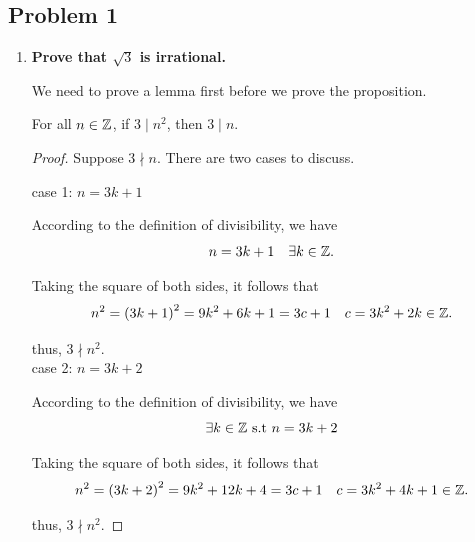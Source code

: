 
\subsection{Problem 1}
\begin{enumerate}[label=(\Roman*)]
    \item \textbf{Prove that $\sqrt{3}$ is irrational.}
    
    We need to prove a lemma first before we prove the proposition. 
     \begin{lemma} \label{lemma 1}
            For all $n \in \mathbb{Z}$, if $3 \mid n^2$, then $3 \mid n$. 

            \begin{proof}
                Suppose $3 \nmid n$. There are two cases to discuss.  
                
                case 1: $n = 3k + 1$

                According to the definition of divisibility, we have 
                \begin{equation*}
                    n = 3k + 1 \quad \exists k \in \mathbb{Z}. 
                \end{equation*} 

                Taking the square of both sides, it follows that 
                \begin{equation*}
                    n^2 = \left(3k + 1\right)^2 = 9k^2 + 6k + 1 =  3c + 1 \quad c = 3k^2 + 2k \in \mathbb{Z}.
                \end{equation*}

                thus, $3 \nmid n^2$.\\

                case 2: $n = 3k + 2$

                According to the definition of divisibility, we have 
                \begin{equation*}
                     \exists k \in \mathbb{Z} \text{ s.t } n = 3k + 2  
                \end{equation*} 

                Taking the square of both sides, it follows that 
                \begin{equation*}
                    n^2 = \left(3k + 2\right)^2 = 9k^2 + 12k + 4 =  3c + 1 \quad c = 3k^2 + 4k + 1 \in \mathbb{Z}.
                \end{equation*}

                thus, $3 \nmid n^2$.
            \end{proof}
        \end{lemma}


\end{enumerate}
